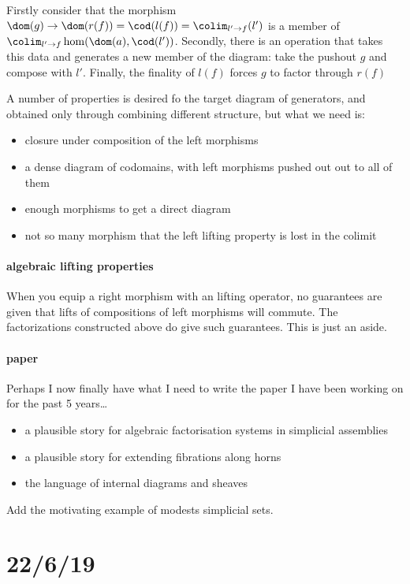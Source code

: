 \documentclass[csh.tex]{subfiles}
\begin{document}
Firstly consider that the morphism
$\dom(g)\to \dom(r(f)) = \cod(l(f)) = \colim_{l'\to f} (l')$ 
is a member of $\colim_{l'\to f} \hom(\dom(a),\cod(l'))$.
Secondly, there is an operation that takes this data and generates a new member 
of the diagram: take the pushout $g$ and compose with $l'$.
Finally, the finality of $l(f)$ forces $g$ to factor through $r(f)$

A number of properties is desired fo the target diagram of generators, and
obtained only through combining different structure, but what we need is:
\begin{itemize}
  \item closure under composition of the left morphisms
  \item a dense diagram of codomains, with left morphisms pushed out out to all 
  of them
  \item enough morphisms to get a direct diagram
  \item not so many morphism that the left lifting property is lost in the 
  colimit
\end{itemize}

\paragraph{algebraic lifting properties}
When you equip a right morphism with an lifting operator, no guarantees are 
given that lifts of compositions of left morphisms will commute. The 
factorizations constructed above do give such guarantees. This is just an aside.

\paragraph{paper}
Perhaps I now finally have what I need to write the paper I have been working 
on for the past 5 years\dots 

\begin{itemize}
  \item a plausible story for algebraic factorisation systems in simplicial 
  assemblies
  \item a plausible story for extending fibrations along horns
  \item the language of internal diagrams and sheaves
\end{itemize}

Add the motivating example of modests simplicial sets.

\section{22/6/19}
\end{document}
